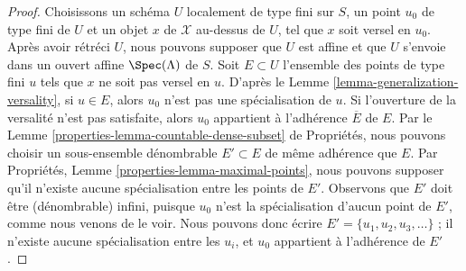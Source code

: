 \begin{proof}
Choisissons un schéma $U$ localement de type fini sur $S$,
un point $u_0$ de type fini de $U$ et un objet $x$ de $\mathcal{X}$
au-dessus de $U$, tel que $x$ soit versel en $u_0$. Après avoir rétréci
$U$, nous pouvons supposer que $U$ est affine et que $U$ s'envoie dans un ouvert affine
$\Spec(\Lambda)$ de $S$. Soit $E \subset U$ l'ensemble des points de type fini
$u$ tels que $x$ ne soit pas versel en $u$. D'après le
Lemme \ref{lemma-generalization-versality},
si $u \in E$, alors $u_0$ n'est pas une spécialisation de $u$.
Si l'ouverture de la versalité n'est pas satisfaite, alors $u_0$ appartient à l'adhérence
$\overline{E}$ de $E$. Par le
Lemme \ref{properties-lemma-countable-dense-subset} de Propriétés,
nous pouvons choisir un sous-ensemble dénombrable $E' \subset E$ de même adhérence
que $E$. Par Propriétés, Lemme \ref{properties-lemma-maximal-points},
nous pouvons supposer qu'il n'existe aucune spécialisation entre les points de $E'$.
Observons que $E'$ doit être (dénombrable) infini, puisque $u_0$
n'est la spécialisation d'aucun point de $E'$, comme nous venons de le voir.
Nous pouvons donc écrire $E' = \{u_1, u_2, u_3, \ldots\}$ ; il
n'existe aucune spécialisation entre les $u_i$, et $u_0$ appartient à l'adhérence
de $E'$.


\end{proof}
